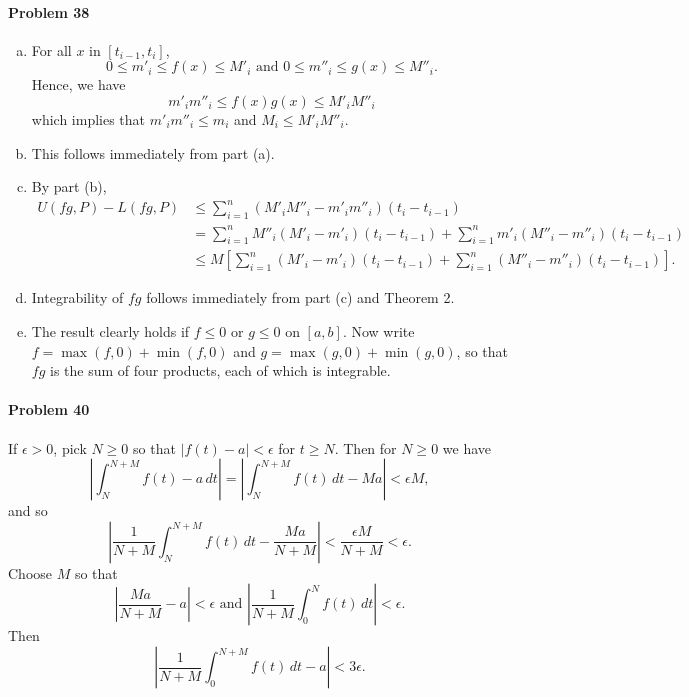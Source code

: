 \documentclass{article}
\begin{document}
\paragraph{Problem 38}
\begin{enumerate}[(a)]
  \item For all $x$ in $[t_{i - 1}, t_i]$, \[
      0 \leq m'_i \leq f(x) \leq M'_i \text{ and } 0 \leq m''_i \leq g(x) \leq
        M''_i.
    \] Hence, we have \[
      m'_im''_i \leq f(x)g(x) \leq M'_iM''_i
    \] which implies that $m'_im''_i \leq m_i$ and $M_i \leq M'_iM''_i$.
  \item This follows immediately from part (a).
  \item By part (b),
    \begin{align*}
      U(fg, P) - L(fg, P)
      &\leq \sum_{i=1}^n (M'_iM''_i - m'_im''_i)(t_i - t_{i-1}) \\
      &= \sum_{i=1}^n M''_i(M'_i - m'_i)(t_i - t_{i-1})
      + \sum_{i=1}^n m'_i(M''_i - m''_i)(t_i - t_{i-1}) \\
      &\leq M\left[
        \sum_{i=1}^n (M'_i - m'_i)(t_i - t_{i-1})
        + \sum_{i=1}^n (M''_i - m''_i)(t_i - t_{i - 1})
      \right].
    \end{align*}
  \item Integrability of $fg$ follows immediately from part (c) and Theorem 2.
  \item The result clearly holds if $f \leq 0$ or $g \leq 0$ on $[a, b]$. Now
    write $f = \max(f, 0) + \min(f, 0)$ and $g = \max(g, 0) + \min(g, 0)$, so
    that $fg$ is the sum of four products, each of which is integrable.
\end{enumerate}

\paragraph{Problem 40} If $\epsilon > 0$, pick $N \geq 0$ so that $|f(t) - a| <
\epsilon$ for $t \geq N$. Then for $N \geq 0$ we have \[
  \left| \int_N^{N + M} f(t) - a \,dt \right|
  = \left| \int_N^{N + M} f(t) \,dt - Ma \right| < \epsilon M,
\] and so \[
  \left|
    \frac{1}{N + M}\int_N^{N + M} f(t) \,dt - \frac{Ma}{N + M}
  \right| < \frac{\epsilon M}{N + M} < \epsilon.
\] Choose $M$ so that \[
  \left| \frac{Ma}{N + M} - a \right| < \epsilon
  \text{ and } \left| \frac{1}{N + M}\int_0^N f(t) \,dt \right| < \epsilon.
\] Then \[
    \left| \frac{1}{N + M}\int_0^{N + M} f(t) \,dt - a \right| < 3\epsilon.
\]
\end{document}
